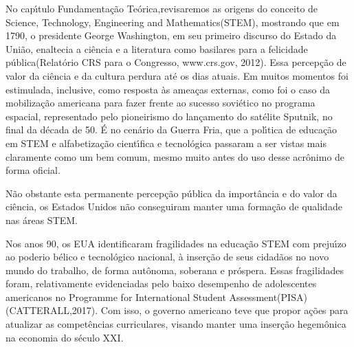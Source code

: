 \documentclass[
12pt,		%
openright,	%
twoside,  %
a4paper,			%
chapter=TITLE,		%
english,			%
french,				%
spanish,			%
brazil				%
]{USPSC-classe/USPSC}
\begin{document}
No cap\'{\i}tulo \textquotedbl Fundamenta\c{c}\~ao Te\'orica,\textquotedbl  revisaremos as origens do conceito de \textquotedbl Science, Technology, Engineering and Mathematics\textquotedbl  (STEM), mostrando que em 1790, o presidente George Washington, em seu primeiro discurso do \textquotedbl Estado da Uni\~ao\textquotedbl , enaltecia a ci\^encia e a literatura como  basilares para a \textquotedbl felicidade p\'ublica\textquotedbl  (Relat\'orio CRS para o Congresso, www.crs.gov, 2012). Essa percep\c{c}\~ao de valor da ci\^encia e da cultura perdura at\'e os dias atuais. Em muitos momentos foi estimulada, inclusive, como resposta \`as amea\c{c}as externas, como foi o caso da mobiliza\c{c}\~ao americana para fazer frente ao sucesso sovi\'etico no programa espacial, representado pelo pioneirismo do lan\c{c}amento do sat\'elite Sputnik, no final da d\'ecada de 50. \'E no cen\'ario da Guerra Fria, que a pol\'{\i}tica de educa\c{c}\~ao em STEM e alfabetiza\c{c}\~ao cient\'{\i}fica e tecnol\'ogica passaram a ser vistas mais claramente como um bem comum, mesmo muito antes do uso desse acr\^onimo de forma oficial.









N\~ao obstante esta permanente percep\c{c}\~ao p\'ublica da import\^ancia e do valor da ci\^encia, os Estados Unidos n\~ao conseguiram manter uma forma\c{c}\~ao de qualidade nas \'areas STEM.









Nos anos 90, os EUA identificaram fragilidades na educa\c{c}\~ao STEM com preju\'{\i}zo ao \textquotedbl poderio b\'elico e tecnol\'ogico nacional\textquotedbl , \`a inser\c{c}\~ao de seus cidad\~aos no novo mundo do trabalho, de forma aut\^onoma, soberana  e pr\'ospera. Essas fragilidades foram, relativamente evidenciadas pelo baixo desempenho de adolescentes americanos no \textquotedbl Programme for International Student Assessment\textquotedbl  (PISA)  (CATTERALL,2017). Com isso, o governo americano teve que propor a\c{c}\~oes para atualizar as compet\^encias curriculares, visando manter uma inser\c{c}\~ao hegem\^onica na economia do s\'eculo XXI.
\end{document}
